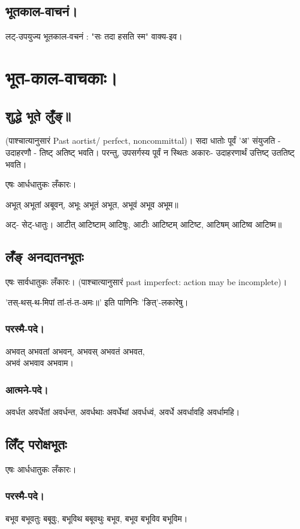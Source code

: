 \documentclass[oneside, article]{memoir}
\begin{document}
\subsection{भूतकाल-वाचनं।}
लट्-उपयुज्य भूतकाल-वचनं : "सः तदा हसति स्म" वाक्य-इव। 

\section{भूत-काल-वाचकाः।}
\subsection{शुद्धे भूते लुँङ्॥}
(पाश्चात्यानुसारं Past aortist/ perfect, noncommittal)।
सदा धातोः पूर्वं 'अ' संयुजति - उदाहरणौ - तिष्ट् अतिष्ट् भवति। परन्तु, उपसर्गस्य पूर्वं न स्थितः अकारः- उदाहरणार्थं उत्तिष्ट् उततिष्ट् भवति।

एषः आर्धधातुकः लँकारः।

अभूत् अभूतां अबूवन्, अभूः अभूतं अभूत, अभूवं अभूव अभूम॥

अट्- सेट्-धातुः। आटीत् आटिष्टाम् आटिषुः, आटीः  आटिष्टम्  आटिष्ट, आटिषम्  आटिष्व  आटिष्म॥

\subsection{लँङ् अनद्यतनभूतः}
एषः सार्वधातुकः लँकारः। (पाश्चात्यानुसारं past imperfect: action may be incomplete)।

'तस्-थस्-थ-मिपां तां-तं-त-अमः॥' इति पाणिनिः 'ङित्'-लकारेषु। 

\subsubsection{परस्मै-पदे।}
अभवत् अभवतां अभवन्, अभवस् अभवतं अभवत, \\अभवं अभवाव अभवाम।

\subsubsection{आत्मने-पदे।}
अवर्धत अवर्धेतां अवर्धन्त, अवर्धथाः अवर्धेथां अवर्धध्वं, अवर्धे अवर्धावहि अवर्धामहि।

\subsection{लिँट् परोक्षभूतः}
एषः आर्धधातुकः लँकारः।

\subsubsection{परस्मै-पदे।}
बभूव बभूवतुः बबूवुः, बभूविथ बबूवथुः बभूव, बभूव बभूविव बभूविम।
\end{document}
